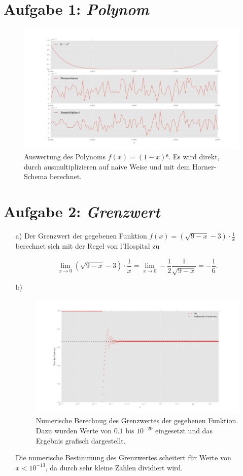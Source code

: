  
\section{Aufgabe 1: \emph{Polynom}}

\begin{figure}
\centering
\includegraphics[width=\textwidth]{plot1.png}
\caption{Auswertung des Polynoms $f(x)=(1-x)⁶$. Es wird direkt, durch ausmultiplizieren auf naive Weise und mit dem Horner-Schema berechnet.}
\end{figure}

\section{Aufgabe 2: \emph{Grenzwert}}

\begin{itemize}
\item[a)] Der Grenzwert der gegebenen Funktion $f(x) = (\sqrt{9-x}-3)\cdot\frac{1}{x} $ berechnet sich mit der Regel von l'Hospital zu 


\begin{equation*}
\lim_{x\to0} (\sqrt{9-x}-3)\cdot\frac{1}{x} = \lim_{x\to0} -\frac{1}{2}\frac{1}{\sqrt{9-x}} = -\frac{1}{6}.
\end{equation*}

\item[b)] \begin{figure}
\centering
\includegraphics[width=\textwidth]{plot2.png}
\caption{Numerische Berechnug des Grenzwertes der gegebenen Funktion. Dazu wurden Werte von $0.1$ bis $10^{-20}$ eingesetzt und das Ergebnis grafisch dargestellt.}
\end{figure}
Die numerische Bestimmung des Grenzwertes scheitert für Werte von $x<10^{-13}$, da durch sehr kleine Zahlen dividiert wird.
\end{itemize}

